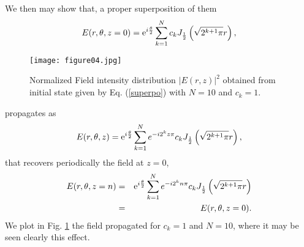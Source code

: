 \documentclass[aps,pra,reprint,superscriptaddress]{revtex4-2}
\begin{document}
We then may show that, a proper superposition of them
%
%
\begin{equation}
   E(r,\theta,z=0)=\hbox{e}^{i\frac{\theta}{2}}\sum_{k=1}^N c_kJ_{\frac{1}{2}}\left(\sqrt{2^{k+1}\pi}r\right),
\end{equation}


\begin{figure}
	\begin{center}
		\texttt{[image: figure04.jpg]} 
		\caption{Normalized Field intensity distribution $\vert E(r,z)\vert^2$ obtained from initial state given by Eq. (\ref{superpo}) with $N=10$ and $c_k=1$.} 
		\label{fig_3}
	\end{center}
\end{figure}
%
%
propagates as
%
%
\begin{equation}
   E(r,\theta,z)=\hbox{e}^{i\frac{\theta}{2}}\sum_{k=1}^Ne^{-i2^{k}z\pi} c_kJ_{\frac{1}{2}}\left(\sqrt{2^{k+1}\pi}r\right),
\end{equation}
%
%
that recovers  periodically the field at $z=0$,
%
%
\begin{eqnarray}\nonumber
   E(r,\theta,z=n)&=&\hbox{e}^{i\frac{\theta}{2}}\sum_{k=1}^Ne^{-i2^{k}n\pi} c_k J_{\frac{1}{2}}\left(\sqrt{2^{k+1}\pi}r\right)\\&=&E(r,\theta,z=0).
\end{eqnarray}
%
%
We plot in Fig. \ref{fig_3} the field propagated for $c_k=1$ and $N=10$, where it may be seen clearly this effect.
\end{document}
